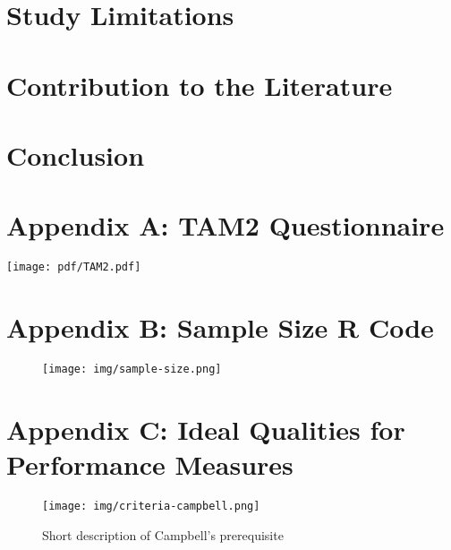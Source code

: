 \documentclass[12pt]{memoir}
\begin{document}
\chapter{Study Limitations}


\chapter{Contribution to the Literature}


\chapter{Conclusion}


\printglossary

\newpage



\appendix

\clearpage
\chapter{Appendix A: TAM2 Questionnaire}
\texttt{[image: pdf/TAM2.pdf]}

\clearpage
\chapter{Appendix B: Sample Size R Code}
\begin{figure}[h]
    \centering
    \texttt{[image: img/sample-size.png]}
\end{figure}

\clearpage
\chapter{Appendix C: Ideal Qualities for Performance Measures}
\begin{figure}[h]
    \centering
    \texttt{[image: img/criteria-campbell.png]}
    \caption{Short description of Campbell's prerequisite \cite{smith2009performance}}
\end{figure}
\end{document}
